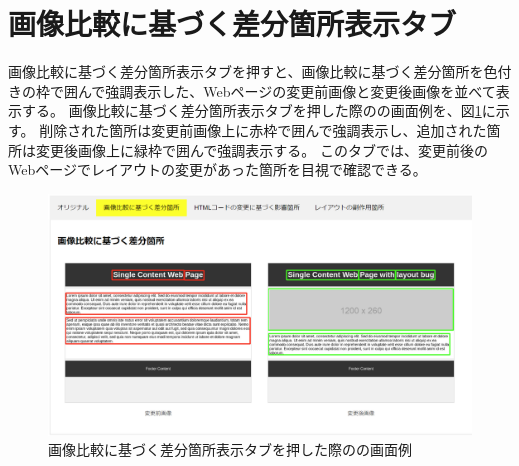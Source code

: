 \section{画像比較に基づく差分箇所表示タブ}\label{sec:images_tab}
画像比較に基づく差分箇所表示タブを押すと、画像比較に基づく差分箇所を色付きの枠で囲んで強調表示した、Webページの変更前画像と変更後画像を並べて表示する。
画像比較に基づく差分箇所表示タブを押した際の\toolName の画面例を、図\ref{fig: Appearance_images_tab}に示す。
削除された箇所は変更前画像上に赤枠で囲んで強調表示し、追加された箇所は変更後画像上に緑枠で囲んで強調表示する。
このタブでは、変更前後のWebページでレイアウトの変更があった箇所を目視で確認できる。
\begin{figure}[tp]
    \begin{center}
        \includegraphics[width=1.0\columnwidth]{image/3_images_tab.png}
        \caption{画像比較に基づく差分箇所表示タブを押した際の\toolName の画面例}
        \label{fig: Appearance_images_tab}
    \end{center}
\end{figure}



